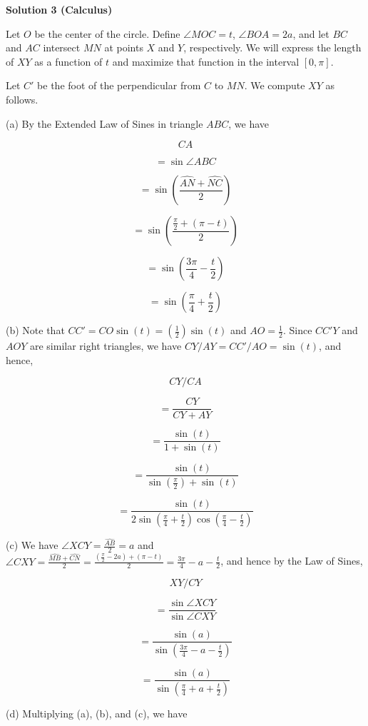 \begin{enumerate}
 



\textbf{Solution 3 (Calculus)}

Let $O$ be the center of the circle. Define $\angle{MOC}=t$, $\angle{BOA}=2a$, and let $BC$ and $AC$ intersect $MN$ at points $X$ and $Y$, respectively. We will express the length of $XY$ as a function of $t$ and maximize that function in the interval $[0, \pi]$.

 Let $C'$ be the foot of the perpendicular from $C$ to $MN$. We compute $XY$ as follows.

 (a) By the Extended Law of Sines in triangle $ABC$, we have

 
 \[CA\]

 \[= \sin\angle{ABC}\]

 \[= \sin\left(\frac{\widehat{AN} + \widehat{NC}}{2}\right)\]

 \[= \sin\left(\frac{\frac{\pi}{2} + (\pi-t)}{2}\right)\]

 \[= \sin\left(\frac{3\pi}{4} - \frac{t}{2}\right)\]

 \[= \sin\left(\frac{\pi}{4} + \frac{t}{2}\right)\]

 (b) Note that $CC' = CO\sin(t) = \left(\frac{1}{2}\right)\sin(t)$ and $AO = \frac{1}{2}$. Since $CC'Y$ and $AOY$ are similar right triangles, we have $CY/AY = CC'/AO = \sin(t)$, and hence,

 
 \[CY/CA\]

 \[= \frac{CY}{CY + AY}\]

 \[= \frac{\sin(t)}{1 + \sin(t)}\]

 \[= \frac{\sin(t)}{\sin\left(\frac{\pi}{2}\right) + \sin(t)}\]

 \[= \frac{\sin(t)}{2\sin\left(\frac{\pi}{4} + \frac{t}{2}\right)\cos\left(\frac{\pi}{4} - \frac{t}{2}\right)}\]

 (c) We have $\angle{XCY} = \frac{\widehat{AB}}{2}=a$ and $\angle{CXY} = \frac{\widehat{MB}+\widehat{CN}}{2} = \frac{\left(\frac{\pi}{2} - 2a\right) + (\pi - t)}{2} = \frac{3\pi}{4} - a - \frac{t}{2}$, and hence by the Law of Sines,

 
 \[XY/CY\]

 \[= \frac{\sin\angle{XCY}}{\sin\angle{CXY}}\]

 \[= \frac{\sin(a)}{\sin\left(\frac{3\pi}{4} - a - \frac{t}{2}\right)}\]

 \[= \frac{\sin(a)}{\sin\left(\frac{\pi}{4} + a + \frac{t}{2}\right)}\]

 (d) Multiplying (a), (b), and (c), we have


\end{enumerate}
